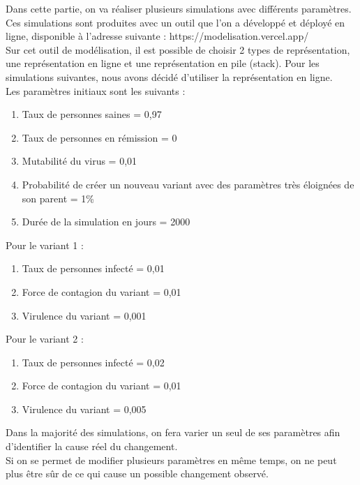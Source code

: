 \documentclass{article}
\begin{document}
Dans cette partie, on va réaliser plusieurs simulations avec différents paramètres. Ces simulations sont produites avec un outil que l'on a développé et déployé en ligne, disponible à l'adresse suivante : https://modelisation.vercel.app/ \\
Sur cet outil de modélisation, il est possible de choisir 2 types de représentation, une représentation en ligne et une représentation en pile (stack). Pour les simulations suivantes, nous avons décidé d'utiliser la représentation en ligne. \\
Les paramètres initiaux sont les suivants : \\
\begin{enumerate}
    \item Taux de personnes saines = 0,97
    \item Taux de personnes en rémission = 0
    \item Mutabilité du virus = 0,01
    \item Probabilité de créer un nouveau variant avec des paramètres très éloignées de son parent = 1\%
    \item Durée de la simulation en jours = 2000 \\
\end{enumerate}
Pour le variant 1 :
\begin{enumerate}
    \item Taux de personnes infecté = 0,01
    \item Force de contagion du variant = 0,01
    \item Virulence du variant = 0,001\\
\end{enumerate}
Pour le variant 2 :
\begin{enumerate}
    \item Taux de personnes infecté = 0,02
    \item Force de contagion du variant = 0,01
    \item Virulence du variant = 0,005\\
\end{enumerate}

Dans la majorité des simulations, on fera varier un seul de ses paramètres afin d'identifier la cause réel du changement. \\
Si on se permet de modifier plusieurs paramètres en même temps, on ne peut plus être sûr de ce qui cause un possible changement observé. \\
\end{document}
